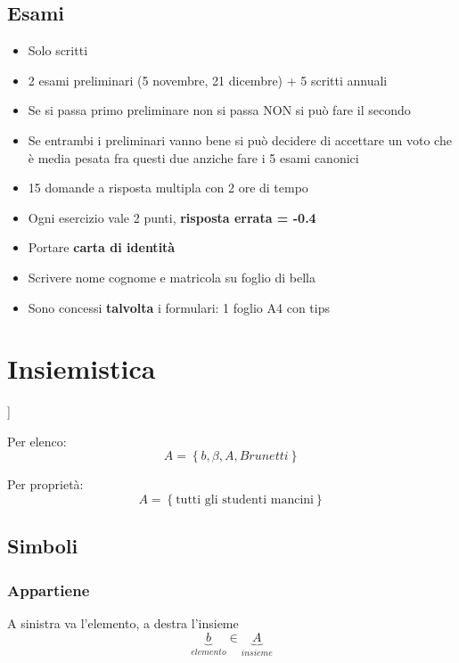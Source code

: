 \subsection{Esami}
\label{sub:esami}
\begin{itemize}
	\item Solo scritti
	\item 2 esami preliminari (5 novembre, 21 dicembre) + 5 scritti annuali
	\item Se si passa primo preliminare non si passa NON si può fare il secondo
	\item Se entrambi i preliminari vanno bene si può decidere di accettare un voto che è media pesata fra questi due anziche fare i 5 esami canonici
	\item 15 domande a risposta multipla con 2 ore di tempo
	\item Ogni esercizio vale 2 punti, \textbf{risposta errata = -0.4}
	\item Portare \textbf{carta di identità}
	\item Scrivere nome cognome e matricola su foglio di bella
	\item Sono concessi \textbf{talvolta} i formulari: 1 foglio A4 con tips
\end{itemize}

\section{Insiemistica}
\label{sec:insiemistica}
\begin{forest}
	[2 definizioni di insieme, for tree={forked edges, draw=gray!20, align=left, grow'=0}
			[Per elenco: enumero nomi oggetti]
			[Per proprietà: es. tutti gli studenti unitn mancini]
	]
\end{forest}


Per elenco: \[
	A = \left\{ b, \beta, A, Brunetti \right\}
\]

Per proprietà:
\[
	A = \left\{ \text{tutti gli studenti mancini} \right\}
\]
\subsection{Simboli}
\label{sub:simboli}

\subsubsection{Appartiene} \quad A sinistra va l'elemento, a destra l'insieme
\[
	\underbrace{b}_{elemento} \in \underbrace{A}_{insieme}
\]

